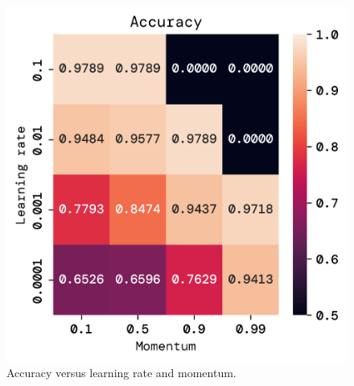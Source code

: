 \documentclass[twoside,11pt]{report}
\begin{document}
    \begin{figure}[!ht]
        \begin{minipage}[t]{0.5\textwidth - 1mm}
            \begin{center}
                \includegraphics[width=\textwidth]{../runsAndFigures/accuracy_lr_gamma.png}
            \end{center}
            \caption
            {
                Accuracy versus learning rate and momentum.
            }\label{fig:accuracy_lr_gamma}
        \end{minipage}
        \hspace{2mm}
        \begin{minipage}[t]{0.5\textwidth - 1mm}
            \begin{center}

\end{center}
\end{minipage}
\end{figure}
\end{document}
